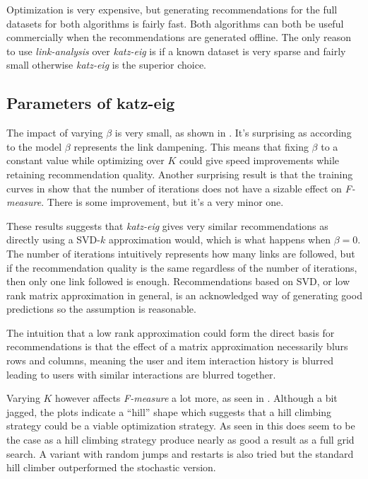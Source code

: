 Optimization is very expensive, but generating recommendations for the full datasets for both algorithms is fairly fast. Both algorithms can both be useful commercially when the recommendations are generated offline. The only reason to use \textit{link-analysis} over \textit{katz-eig} is if a known dataset is very sparse and fairly small otherwise \textit{katz-eig} is the superior choice.

\subsection{Parameters of katz-eig}

The impact of varying $\beta$ is very small, as shown in . It's surprising as according to the model $\beta$ represents the link dampening.  This means that fixing $\beta$ to a constant value while optimizing over $K$ could give speed improvements while retaining recommendation quality. Another surprising result is that the training curves in  show that the number of iterations does not have a sizable effect on \textit{F-measure}. There is some improvement, but it's a very minor one.

These results suggests that \textit{katz-eig} gives very similar recommendations as directly using a SVD-$k$ approximation would, which is what happens when $\beta = 0$. The number of iterations intuitively represents how many links are followed, but if the recommendation quality is the same regardless of the number of iterations, then only one link followed is enough. Recommendations based on SVD, or low rank matrix approximation in general, is an acknowledged way of generating good predictions \citep{bobadilla2013recommender} so the assumption is reasonable.

The intuition that a low rank approximation could form the direct basis for recommendations is that the effect of a matrix approximation necessarily blurs rows and columns, meaning the user and item interaction history is blurred leading to users with similar interactions are blurred together.

Varying $K$ however affects \textit{F-measure} a lot more, as seen in . Although a bit jagged, the plots indicate a ``hill'' shape which suggests that a hill climbing strategy could be a viable optimization strategy. As seen in  this does seem to be the case as a hill climbing strategy produce nearly as good a result as a full grid search. A variant with random jumps and restarts is also tried but the standard hill climber outperformed the stochastic version.

